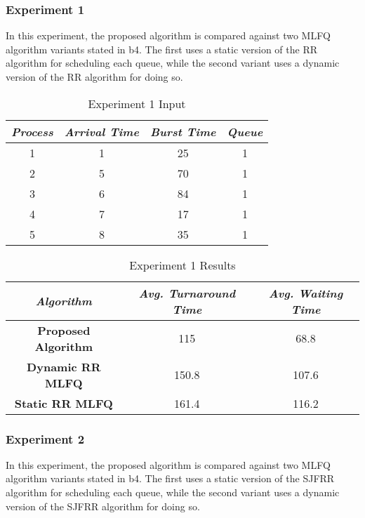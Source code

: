 \documentclass[conference]{IEEEtran}
\newcommand\T{\rule{0pt}{2.6ex}}       %
\newcommand\B{\rule[-1.2ex]{0pt}{0pt}} %
\begin{document}
\subsubsection{Experiment 1}

In this experiment, the proposed algorithm is compared against two MLFQ algorithm variants stated in {b4}. The first uses a static version of the RR algorithm for scheduling each queue, while the second variant uses a dynamic version of the RR algorithm for doing so.

\begin{table}[H]
    \caption{Experiment 1 Input}
    \centering
     \begin{tabular}{||c c c c||} 
     \hline
     \textit{\textbf{Process}} & \textit{\textbf{Arrival Time}} & \textit{\textbf{Burst Time}} & \textit{\textbf{Queue}} \T \B \\ 
     \hline
     \hline
     1 & 1 & 25 & 1 \T \B \\ 
     \hline
     2 & 5 & 70 & 1 \T \B \\
     \hline
     3 & 6 & 84 & 1 \T \B \\
     \hline
     4 & 7 & 17 & 1 \T \B \\
     \hline
     5 & 8 & 35 & 1 \T \B \\ 
     \hline
     \end{tabular}
\end{table}

\begin{table}[H]
    \caption{Experiment 1 Results}
    \centering
    \begin{tabular}{||c c c||}
        \hline
        \textit{\textbf{Algorithm}} & \textit{\textbf{Avg. Turnaround Time}} & \textit{\textbf{Avg. Waiting Time}}\T \B \\
    \hline
    \hline
    \textbf{Proposed Algorithm} & 115 & 68.8 \T \B\\ \hline
    \textbf{Dynamic RR MLFQ} & 150.8 & 107.6\T \B\\ \hline
    \textbf{Static RR MLFQ} & 161.4 & 116.2 \T \B\\ \hline
     \end{tabular}
\end{table}

\subsubsection{Experiment 2}

In this experiment, the proposed algorithm is compared against two MLFQ algorithm variants stated in {b4}. The first uses a static version of the SJFRR algorithm for scheduling each queue, while the second variant uses a dynamic version of the SJFRR algorithm for doing so. 
\end{document}
